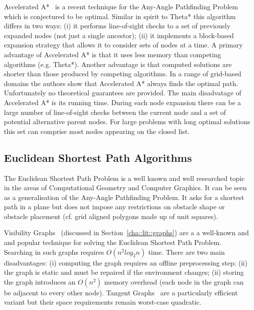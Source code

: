 Accelerated A*~\citep{sislak09a,sislak09b} is a recent technique for the Any-Angle Pathfinding
Problem which is conjectured to be optimal. Similar in spirit to Theta* this algorithm differs in
two ways: (i) it performs line-of-sight checks to a set of previously expanded nodes (not just a
single ancestor); (ii) it implements a block-based expansion strategy that allows it to consider
sets of nodes at a time.  
A primary advantage of Accelerated A* is that it uses less memory than competing algorithms (e.g. Theta*).
Another advantage is that computed solutions are shorter than those produced by competing
algorithms. In a range of grid-based domains the authors show that Accelerated A* always finds the
optimal path.  Unfortunately no theoretical guarantees are provided.  The main disadvatage of
Accelerated A* is its running time. During each node expansion there can be a large number of
line-of-sight checks between the current node and a set of potential alternative parent nodes.  For
large problems with long optimal solutions this set can comprise most nodes appearing on the closed
list.


\subsection{Euclidean Shortest Path Algorithms}
\label{cha::lit::euclidean::euclidean}
The Euclidean Shortest Path Problem is a well known and well researched topic in the areas of
Computational Geometry and Computer Graphics. It can be seen as a generalisation of the Any-Angle 
Pathfinding Problem. It asks for a shortest path in a plane but does not impose any restrictions on
obstacle shape or obstacle placement (cf. grid aligned polygons made up of unit squares). 

Visibility Graphs~\cite{lozanoperez79} (discussed in Section~\ref{cha::lit::graphs})
are a a well-known and and popular technique for solving the Euclidean Shortest Path 
Problem. Searching in such graphs requires $O(n^2log_{2}{n})$ time.  There are two 
main disadvantages: (i) computing the graph requires an offline preprocessing step;
(ii) the graph is static and must be repaired if the environment changes;
(ii) storing the graph introduces an $O(n^2)$ memory overhead (each node in 
the graph can be adjacent to every other node). Tangent Graphs~\cite{liu92} are a 
particularly efficient variant but their space requirements remain worst-case 
quadratic. 

